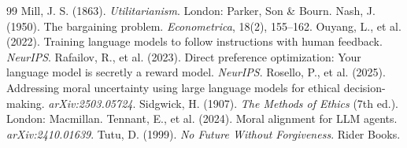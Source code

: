 \documentclass[10pt,twocolumn,a4paper]{article}
\begin{document}
\begin{thebibliography}{99}
 Mill, J. S. (1863). \textit{Utilitarianism}. London: Parker, Son \& Bourn.
 Nash, J. (1950). The bargaining problem. \textit{Econometrica}, 18(2), 155--162.
 Ouyang, L., et al. (2022). Training language models to follow instructions with human feedback. \textit{NeurIPS}.
 Rafailov, R., et al. (2023). Direct preference optimization: Your language model is secretly a reward model. \textit{NeurIPS}.
 Rosello, P., et al. (2025). Addressing moral uncertainty using large language models for ethical decision-making. \textit{arXiv:2503.05724}.
 Sidgwick, H. (1907). \textit{The Methods of Ethics} (7th ed.). London: Macmillan.
 Tennant, E., et al. (2024). Moral alignment for LLM agents. \textit{arXiv:2410.01639}.
 Tutu, D. (1999). \textit{No Future Without Forgiveness}. Rider Books.
\end{thebibliography}
\end{document}
